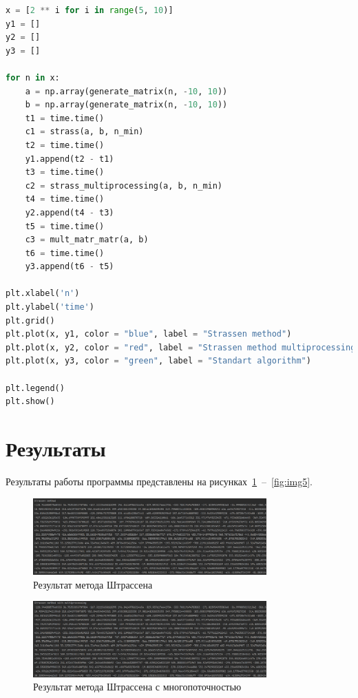 \documentclass[a4paper, 14pt]{extarticle}
\begin{document}
\begin{lstlisting}[language={python},caption={Метод Штрассена},label={lst:code1}]
x = [2 ** i for i in range(5, 10)]
y1 = []
y2 = []
y3 = []

for n in x:
    a = np.array(generate_matrix(n, -10, 10))
    b = np.array(generate_matrix(n, -10, 10))
    t1 = time.time()
    c1 = strass(a, b, n_min)
    t2 = time.time()
    y1.append(t2 - t1)
    t3 = time.time()
    c2 = strass_multiprocessing(a, b, n_min)
    t4 = time.time()
    y2.append(t4 - t3)
    t5 = time.time()
    c3 = mult_matr_matr(a, b)
    t6 = time.time()
    y3.append(t6 - t5)

plt.xlabel('n')
plt.ylabel('time')
plt.grid()
plt.plot(x, y1, color = "blue", label = "Strassen method")
plt.plot(x, y2, color = "red", label = "Strassen method multiprocessing")
plt.plot(x, y3, color = "green", label = "Standart algorithm")

plt.legend()
plt.show()

\end{lstlisting}

\section{Результаты}\label{Sect::res}

Результаты работы программы представлены на рисунках~\ref{fig:img1}~--~\ref{fig:img5}.

\begin{figure}[!htb]
	\centering
	\includegraphics[width=0.8\textwidth]{img1}
\caption{Результат метода Штрассена}
\label{fig:img1}
\end{figure}

\begin{figure}[!htb]
	\centering
	\includegraphics[width=0.8\textwidth]{img2}
\caption{Результат метода Штрассена с многопоточностью}
\label{fig:img2}
\end{figure}
\end{document}

